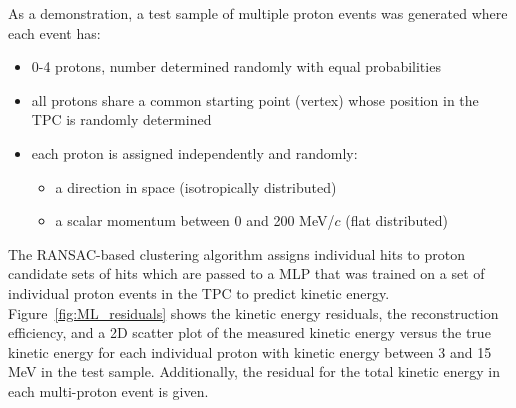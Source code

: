 As a demonstration, a test sample of multiple proton events was generated where each event has:
\begin{itemize}
\item 0-4 protons, number determined randomly with equal probabilities
\item all protons share a common starting point (vertex) whose position in the TPC is randomly determined
\item each proton is assigned independently and randomly:
\begin{itemize}
\item a direction in space (isotropically distributed)
\item a scalar momentum between 0 and 200 MeV/$c$ (flat distributed)
\end{itemize}
\end{itemize}

The RANSAC-based clustering algorithm assigns individual hits to proton candidate sets of hits which are
passed to a MLP that was trained on a set of individual proton events in the TPC to predict kinetic energy.  Figure~\ref{fig:ML_residuals} shows the kinetic energy residuals, the reconstruction efficiency,
and a 2D scatter plot of the measured kinetic energy versus the true kinetic energy
for each individual proton with kinetic energy between 3 and 15 MeV in the test sample.  Additionally, the residual for the total kinetic energy in each multi-proton event is given. 
%
%

